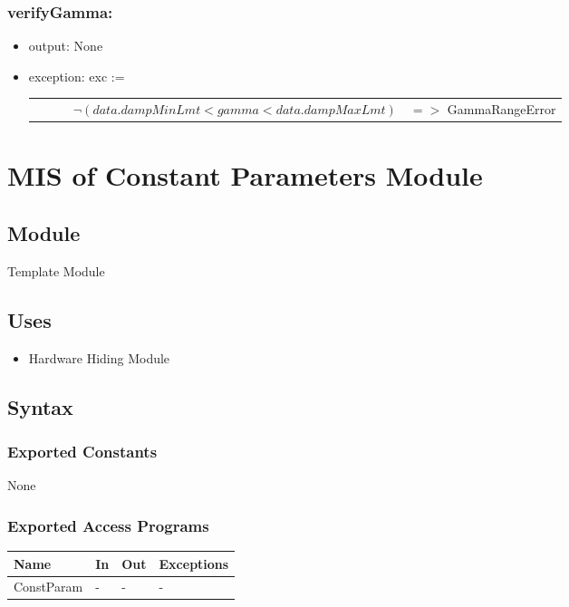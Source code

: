 \documentclass[12pt, titlepage]{article}
\begin{document}
	
	\subsubsection*{verifyGamma:} \begin{itemize} \item output: None \item
		exception: exc :=  \noindent \begin{longtable*}[l]{l l} \ \ \ \ \ \ $\neg
			(data.dampMinLmt <  gamma < data.dampMaxLmt)$ & $=>$ GammaRangeError\\
		\end{longtable*}
		
	\end{itemize}
	
	
	\newpage %
	\section{MIS of Constant Parameters Module} \label{CPM}
	
	
	\subsection{Module} Template Module
	
	\subsection{Uses} \begin{itemize} \item Hardware Hiding Module \end{itemize}
	
	\subsection{Syntax}
	
	\subsubsection{Exported Constants}
	
	None
	
	\subsubsection{Exported Access Programs}
	
	\begin{center} \begin{tabular}{p{2cm} p{4cm} p{4cm} p{2cm}} \hline
			\textbf{Name} & \textbf{In} & \textbf{Out} & \textbf{Exceptions} \\ \hline
			ConstParam & - & - & - \\ \hline \end{tabular} \end{center}
	
\end{document}
